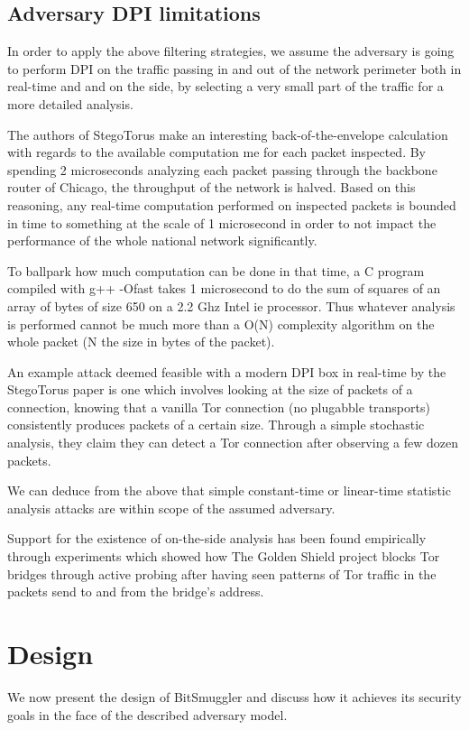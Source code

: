 \documentclass[11pt]{book} %
\newcommand{\projectName}{BitSmuggler }
\begin{document}
\section{Adversary DPI limitations}
\label{subsec:dpiLimitations}

In order to apply the above filtering strategies, we assume the adversary is going to perform DPI on the traffic passing in and out of the network perimeter both in real-time and and on the side, by selecting a very small part of the traffic for a more detailed analysis.

The authors of StegoTorus  \citep*{stegotorus} make an interesting back-of-the-envelope calculation with regards to the available computation me for each packet inspected. By spending 2 microseconds analyzing each packet passing through the backbone router of Chicago, the throughput of the network is halved. Based on this reasoning, any real-time computation performed on inspected packets is bounded in time to something at the scale of 1 microsecond in order to not impact the performance of the whole national network significantly.

To ballpark how much computation can be done in that time, a C program compiled with g++  -Ofast takes 1 microsecond to do the sum of squares of an array of bytes of size 650 on a 2.2 Ghz Intel ie processor. Thus whatever analysis is performed cannot be much more than a O(N) complexity algorithm on the whole packet (N the size in bytes of the packet).

An example attack deemed feasible with a modern DPI box in real-time by the StegoTorus paper is one which involves looking at the size of packets of a connection, knowing that a vanilla Tor connection (no plugabble transports) consistently produces packets of a certain size. Through a simple stochastic analysis, they claim they can detect a Tor connection after observing a few dozen packets.

We can deduce from the above that simple constant-time  or linear-time statistic analysis attacks are within scope of the assumed adversary.

Support for the existence of on-the-side analysis has been found empirically through experiments which showed how The Golden Shield project blocks Tor bridges through active probing after having seen patterns of Tor traffic in the packets send to and from the bridge's address.

\chapter{Design}
We now present the design of  \projectName and discuss how it achieves its security goals in the face of the described adversary model.
\end{document}
